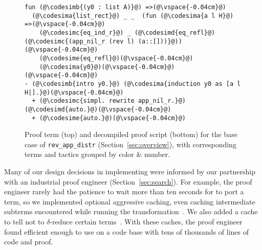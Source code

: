 \begin{figure}
\begin{lstlisting}
fun (@\codesimb{(y0 : list A)}@) =>(@\vspace{-0.04cm}@)
  (@\codesima{list_rect}@) _ _  (fun (@\codesima{a l H}@) =>(@\vspace{-0.04cm}@)
    (@\codesimc{eq_ind_r}@) _ (@\codesimd{eq_refl}@) (@\codesimc{(app_nil_r (rev l) (a::[]))}@))(@\vspace{-0.04cm}@)
    (@\codesime{eq_refl}@)(@\vspace{-0.04cm}@)
    (@\codesima{y0}@)(@\vspace{-0.04cm}@)
(@\vspace{-0.04cm}@)
- (@\codesimb{intro y0.}@) (@\codesima{induction y0 as [a l H|].}@)(@\vspace{-0.04cm}@)
  + (@\codesimc{simpl. rewrite app_nil_r.}@) (@\codesimd{auto.}@)(@\vspace{-0.04cm}@)
  + (@\codesime{auto.}@)(@\vspace{-0.04cm}@)
\end{lstlisting}
\vspace{-0.3cm}
\caption{Proof term (top) and decompiled proof script (bottom) for the base case of 
\lstinline{rev_app_distr} (Section~\ref{sec:overview}), with corresponding terms and tactics 
grouped by color \& number.}
\label{fig:rainbow}
\end{figure}


Many of our design decisions in implementing \toolname were informed by our partnership with
an industrial proof engineer (Section~\ref{sec:search}).
For example, the proof engineer rarely had the patience to wait more than ten seconds
for \toolname to port a term,
so we implemented optional aggressive caching, even caching intermediate subterms
encountered while running the transformation~\href{https://github.com/uwplse/pumpkin-pi/blob/v2.0.0/plugin/src/cache/caching.ml}{}. %
We also added a cache to tell \toolname not to $\delta$-reduce certain terms~\href{https://github.com/uwplse/pumpkin-pi/blob/v2.0.0/plugin/src/cache/caching.ml}{}.
With these caches, the proof engineer found \toolname efficient enough to use on a code base with tens of thousands of lines of code and proof.



